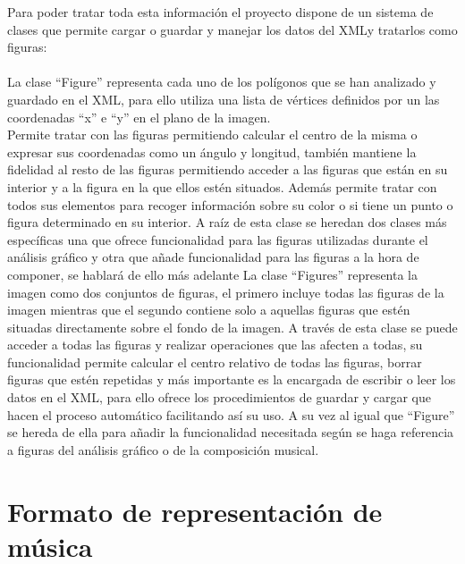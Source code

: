 
Para poder tratar toda esta información el proyecto dispone de un sistema de clases que permite cargar o guardar y manejar los datos del XMLy tratarlos como figuras:
\\
\newline
\\La clase ``Figure'' representa cada uno de los polígonos que se han analizado y guardado en el XML, para ello utiliza una lista de vértices definidos por un las coordenadas ``x'' e ``y'' en el plano de la imagen. 
\\Permite tratar con las figuras permitiendo calcular el centro de la misma o expresar sus coordenadas como un ángulo y longitud, también mantiene la fidelidad al resto de las figuras permitiendo acceder a las figuras que están en su interior y a la figura en la que ellos estén situados. Además permite tratar con todos sus elementos para recoger información sobre su color o si tiene un punto o figura determinado en su interior. A raíz de esta clase se heredan dos clases más específicas una que ofrece funcionalidad para las figuras utilizadas durante el análisis gráfico y otra que añade funcionalidad para las figuras a la hora de componer, se hablará de ello más adelante 
\newline
La clase ``Figures'' representa la imagen como dos conjuntos de figuras, el primero incluye todas las figuras de la imagen mientras que el segundo contiene solo a aquellas figuras que estén situadas directamente sobre el fondo de la imagen. A través de esta clase se puede acceder a todas las figuras y realizar operaciones que las afecten a todas, su funcionalidad permite calcular el centro relativo de todas las figuras, borrar figuras que estén repetidas  y más importante es la encargada de escribir o leer los datos en el XML, para ello ofrece los procedimientos de guardar y cargar que hacen el proceso automático facilitando así su uso.
A su vez al igual que ``Figure'' se hereda de ella para añadir la funcionalidad necesitada según se haga referencia a figuras del análisis gráfico o de la composición musical.


\section{Formato de representación de música}

